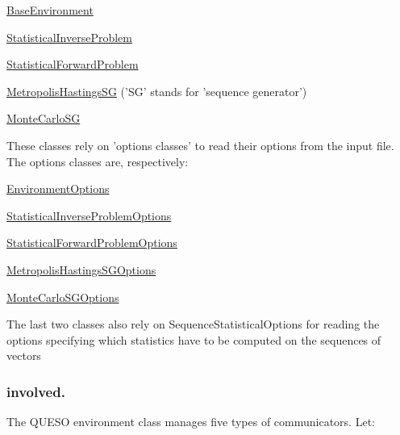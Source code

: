 \begin{DoxyEnumerate}
\begin{DoxyEnumerate}
\item \hyperlink{class_q_u_e_s_o_1_1_base_environment}{Base\-Environment} 
\item \hyperlink{class_q_u_e_s_o_1_1_statistical_inverse_problem}{Statistical\-Inverse\-Problem} 
\item \hyperlink{class_q_u_e_s_o_1_1_statistical_forward_problem}{Statistical\-Forward\-Problem} 
\item \hyperlink{class_q_u_e_s_o_1_1_metropolis_hastings_s_g}{Metropolis\-Hastings\-S\-G} ('S\-G' stands for 'sequence generator') 
\item \hyperlink{class_q_u_e_s_o_1_1_monte_carlo_s_g}{Monte\-Carlo\-S\-G} 
\end{DoxyEnumerate}\begin{DoxyVerb}These classes rely on 'options classes' to read their options from the input file.
The options classes are, respectively:
\end{DoxyVerb}
 
\begin{DoxyEnumerate}
\item \hyperlink{class_q_u_e_s_o_1_1_environment_options}{Environment\-Options} 
\item \hyperlink{class_q_u_e_s_o_1_1_statistical_inverse_problem_options}{Statistical\-Inverse\-Problem\-Options} 
\item \hyperlink{class_q_u_e_s_o_1_1_statistical_forward_problem_options}{Statistical\-Forward\-Problem\-Options} 
\item \hyperlink{class_q_u_e_s_o_1_1_metropolis_hastings_s_g_options}{Metropolis\-Hastings\-S\-G\-Options} 
\item \hyperlink{class_q_u_e_s_o_1_1_monte_carlo_s_g_options}{Monte\-Carlo\-S\-G\-Options} 
\end{DoxyEnumerate}The last two classes also rely on Sequence\-Statistical\-Options for reading the options specifying which statistics have to be computed on the sequences of vectors \subsubsection*{involved. }



\begin{DoxyVerb}The QUESO environment class manages five types of communicators. Let:
\end{DoxyVerb}
 

\end{DoxyEnumerate}
